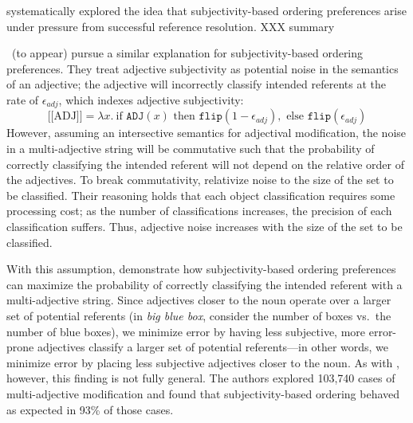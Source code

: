 \documentclass[10pt,a4paper]{article}
\newcommand{\sem}[1]{\mbox{$[\![$#1$]\!]$}}
\begin{document}
 systematically explored the idea that subjectivity-based ordering preferences arise under pressure from successful reference resolution. XXX summary

\citeauthor{scontrasetalSPadjectives}~(to appear) pursue a similar explanation for subjectivity-based ordering preferences. They treat adjective subjectivity as potential noise in the semantics of an adjective; the adjective will incorrectly classify intended referents at the rate of $\epsilon_{adj}$, which indexes adjective subjectivity:
$$\sem{ADJ} = \lambda x.\ \textrm{if } \texttt{ADJ}(x) \textrm{ then } \texttt{flip}(1- \epsilon_{adj}), \textrm{ else } \texttt{flip}(\epsilon_{adj})$$
However, assuming an intersective semantics for adjectival modification, the noise in a multi-adjective string will be commutative such that the probability of correctly classifying the intended referent will not depend on the relative order of the adjectives. To break commutativity, \citeauthor{scontrasetalSPadjectives} relativize noise to the size of the set to be classified. Their reasoning holds that each object classification requires some processing cost; as the number of classifications increases, the precision of each classification suffers. Thus, adjective noise increases with the size of the set to be classified. 

With this assumption, \citeauthor{scontrasetalSPadjectives} demonstrate how subjectivity-based ordering preferences can maximize the probability of correctly classifying the intended referent with a multi-adjective string. Since adjectives closer to the noun operate over a larger set of potential referents (in \emph{big blue box}, consider the number of boxes vs.~the number of blue boxes), we minimize error by having less subjective, more error-prone adjectives classify a larger set of potential referents---in other words, we minimize error by placing less subjective adjectives closer to the noun. As with , however, this finding is not fully general. The authors explored 103,740 cases of multi-adjective modification and found that subjectivity-based ordering behaved as expected in 93\% of those cases.
\end{document}
